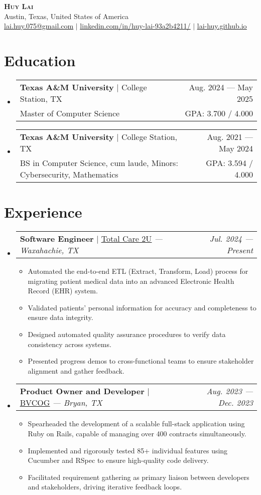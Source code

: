 \documentclass[letterpaper,12pt]{article}
\makeatletter
\newcommand{\resumeItem}[1]{
  \item\small{
    {#1 \vspace{-2pt}}
  }
}
\newcommand{\resumeDegreeheading}[5]{
  \vspace{-2pt}\item
    \begin{tabular*}{0.97\textwidth}[t]{l@{\extracolsep{\fill}}r}
      \textbf{#1} $|$ #2 & #3 \\
      \small#4 & GPA: \small #5 / 4.000 \\
    \end{tabular*}\vspace{-7pt}
}
\newcommand{\resumeSubheading}[4]{
  \vspace{-2pt}\item
    \begin{tabular*}{0.97\textwidth}[t]{l@{\extracolsep{\fill}}r}
      \textbf{#1} $|$ #2 \textit{--- #3} & \textit{#4} \\
    \end{tabular*}\vspace{-7pt}
}
\newcommand{\resumeSubHeadingListStart}{\begin{itemize}[leftmargin=0pt, label={}]}
\newcommand{\resumeSubHeadingListEnd}{\end{itemize}}
\newcommand{\resumeItemListStart}{\begin{itemize}[leftmargin=10pt]}
\newcommand{\resumeItemListEnd}{\end{itemize}\vspace{-10pt}}
\makeatother
\begin{document}
\begin{center}
    \textbf{\Huge \scshape Huy Lai} \\ \vspace{1pt}
    \small{Austin, Texas, United States of America} \\
    \small \href{mailto:lai.huy.075@gmail.com}{\underline{lai.huy.075@gmail.com}} $|$
    \href{https://www.linkedin.com/in/huy-lai-93a2b4211/}{\underline{linkedin.com/in/huy-lai-93a2b4211/}} $|$
    \href{https://lai-huy.github.io}{\underline{lai-huy.github.io}}
\end{center}


\vspace{-12pt}
\section{Education}
  \resumeSubHeadingListStart
    \resumeDegreeheading
      {Texas A\&M University}{College Station, TX}
      {Aug. 2024 --- May 2025}{Master of Computer Science}
      {3.700}
  
    \resumeDegreeheading
      {Texas A\&M University}{College Station, TX}
      {Aug. 2021 --- May 2024}{BS in Computer Science, cum laude, Minors: Cybersecurity, Mathematics}
      {3.594}
      
  \resumeSubHeadingListEnd

\vspace{-16pt}
\section{Experience}
  \resumeSubHeadingListStart
    \resumeSubheading
      {Software Engineer}{\href{https://www.totalcare2u.com/}{\underline{Total Care 2U}}}
      {Waxahachie, TX}{Jul. 2024 --- Present}
      \resumeItemListStart
        \resumeItem{Automated the end-to-end ETL (Extract, Transform, Load) process for migrating patient medical data into an advanced Electronic Health Record (EHR) system.}
        \resumeItem{Validated patients' personal information for accuracy and completeness to ensure data integrity.}
        \resumeItem{Designed automated quality assurance procedures to verify data consistency across systems.}
        \resumeItem{Presented progress demos to cross-functional teams to ensure stakeholder alignment and gather feedback.}
    \resumeItemListEnd

    \resumeSubheading
      {Product Owner and Developer}{\href{https://www.bvcog.org/}{\underline{BVCOG}}}
      {Bryan, TX}{Aug. 2023 --- Dec. 2023}
      \resumeItemListStart
        \resumeItem{Spearheaded the development of a scalable full-stack application using Ruby on Rails, capable of managing over 400 contracts simultaneously.}
        \resumeItem{Implemented and rigorously tested 85+ individual features using Cucumber and RSpec to ensure high-quality code delivery.}
        \resumeItem{Facilitated requirement gathering as primary liaison between developers and stakeholders, driving iterative feedback loops.}
      \resumeItemListEnd
  \resumeSubHeadingListEnd
\end{document}

